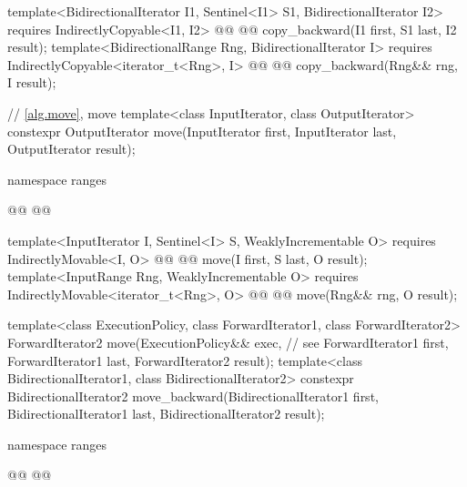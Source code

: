\begin{addedblock}
\begin{codeblock}
{    template<BidirectionalIterator I1, Sentinel<I1> S1, BidirectionalIterator I2>
      requires IndirectlyCopyable<I1, I2>
      @@
      @@
        copy_backward(I1 first, S1 last, I2 result);
    template<BidirectionalRange Rng, BidirectionalIterator I>
      requires IndirectlyCopyable<iterator_t<Rng>, I>
      @@
      @@
        copy_backward(Rng&& rng, I result);
  }
\end{codeblock}\end{addedblock}\begin{codeblock}

  // \ref{alg.move}, move
  template<class InputIterator, class OutputIterator>
    constexpr OutputIterator move(InputIterator first, InputIterator last,
                                  OutputIterator result);
\end{codeblock}\begin{addedblock}\begin{codeblock}
  namespace ranges {
    @@
    @@

    template<InputIterator I, Sentinel<I> S, WeaklyIncrementable O>
      requires IndirectlyMovable<I, O>
      @@
      @@
        move(I first, S last, O result);
    template<InputRange Rng, WeaklyIncrementable O>
      requires IndirectlyMovable<iterator_t<Rng>, O>
      @@
      @@
        move(Rng&& rng, O result);
  }
\end{codeblock}\end{addedblock}\begin{codeblock}
  template<class ExecutionPolicy, class ForwardIterator1,
           class ForwardIterator2>
    ForwardIterator2 move(ExecutionPolicy&& exec, // see 
                          ForwardIterator1 first, ForwardIterator1 last,
                          ForwardIterator2 result);
  template<class BidirectionalIterator1, class BidirectionalIterator2>
    constexpr BidirectionalIterator2
      move_backward(BidirectionalIterator1 first, BidirectionalIterator1 last,
                    BidirectionalIterator2 result);
\end{codeblock}\begin{addedblock}\begin{codeblock}
  namespace ranges {
    @@
    @@

}
\end{codeblock}
\end{addedblock}
